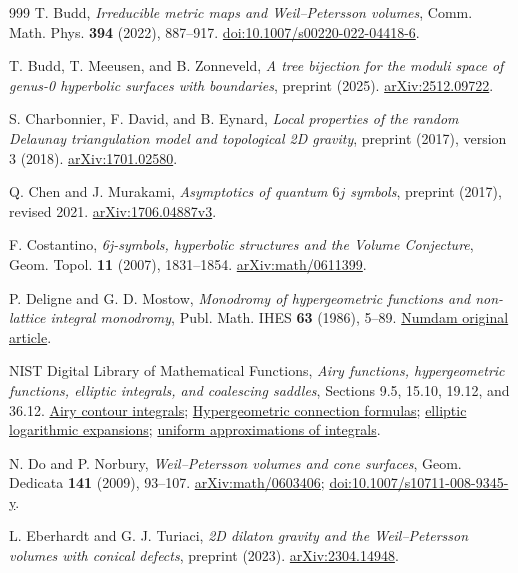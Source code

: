 \documentclass[11pt,a4paper]{article}
\numberwithin{equation}{section}
\theoremstyle{definition}
\theoremstyle{remark}
\begin{document}
\begin{thebibliography}{999}
T. Budd,
\emph{Irreducible metric maps and Weil--Petersson volumes},
Comm. Math. Phys. \textbf{394} (2022), 887--917.
\href{https://doi.org/10.1007/s00220-022-04418-6}{doi:10.1007/s00220-022-04418-6}.

T. Budd, T. Meeusen, and B. Zonneveld,
\emph{A tree bijection for the moduli space of genus-0 hyperbolic surfaces
with boundaries}, preprint (2025).
\href{https://arxiv.org/abs/2512.09722}{arXiv:2512.09722}.

S. Charbonnier, F. David, and B. Eynard,
\emph{Local properties of the random Delaunay triangulation model and
topological 2D gravity}, preprint (2017), version 3 (2018).
\href{https://arxiv.org/abs/1701.02580}{arXiv:1701.02580}.

Q. Chen and J. Murakami,
\emph{Asymptotics of quantum $6j$ symbols}, preprint (2017), revised 2021.
\href{https://arxiv.org/abs/1706.04887v3}{arXiv:1706.04887v3}.

F. Costantino,
\emph{6j-symbols, hyperbolic structures and the Volume Conjecture},
Geom. Topol. \textbf{11} (2007), 1831--1854.
\href{https://arxiv.org/abs/math/0611399}{arXiv:math/0611399}.

P. Deligne and G. D. Mostow,
\emph{Monodromy of hypergeometric functions and non-lattice integral monodromy},
Publ. Math. IHES \textbf{63} (1986), 5--89.
\href{https://www.numdam.org/item/PMIHES_1986__63__5_0/}{Numdam original article}.

NIST Digital Library of Mathematical Functions,
\emph{Airy functions, hypergeometric functions, elliptic integrals,
and coalescing saddles},
Sections 9.5, 15.10, 19.12, and 36.12.
\href{https://dlmf.nist.gov/9.5}{Airy contour integrals};
\href{https://dlmf.nist.gov/15.10}{Hypergeometric connection formulas};
\href{https://dlmf.nist.gov/19.12}{elliptic logarithmic expansions};
\href{https://dlmf.nist.gov/36.12}{uniform approximations of integrals}.

N. Do and P. Norbury,
\emph{Weil--Petersson volumes and cone surfaces},
Geom. Dedicata \textbf{141} (2009), 93--107.
\href{https://arxiv.org/abs/math/0603406}{arXiv:math/0603406};
\href{https://doi.org/10.1007/s10711-008-9345-y}{doi:10.1007/s10711-008-9345-y}.

L. Eberhardt and G. J. Turiaci,
\emph{2D dilaton gravity and the Weil--Petersson volumes with conical defects},
preprint (2023).
\href{https://arxiv.org/abs/2304.14948}{arXiv:2304.14948}.


\end{thebibliography}
\end{document}
